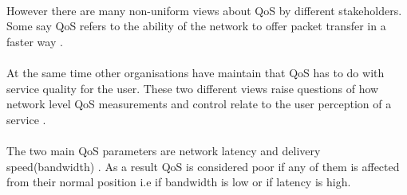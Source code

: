 \paragraph{}
However there are many non-uniform views about QoS by different
stakeholders. Some say QoS refers to the ability of the
network to offer packet transfer in a faster way \cite{5430142}.
\paragraph{}
At the same time other organisations have maintain that
QoS has to do with service quality for the user. These
two different views raise questions of how network level QoS measurements and control relate to the user perception of a service \cite{5430142}.
\paragraph{}
The two main QoS parameters are network latency
and delivery speed(bandwidth) \cite{5430142}. As a result QoS is
considered poor if any of them is affected from their normal position i.e if bandwidth is low or if latency is high.

